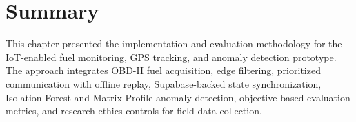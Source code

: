 \section{Summary}

This chapter presented the implementation and evaluation methodology for the IoT-enabled fuel monitoring, GPS tracking, and anomaly detection prototype. The approach integrates OBD-II fuel acquisition, edge filtering, prioritized communication with offline replay, Supabase-backed state synchronization, Isolation Forest and Matrix Profile anomaly detection, objective-based evaluation metrics, and research-ethics controls for field data collection.
